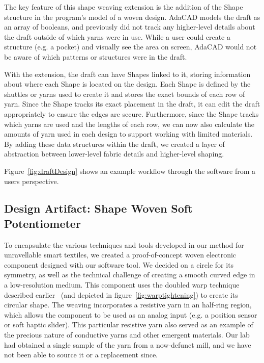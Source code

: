 \documentclass{sigchi}
\newcommand\laura[1]{#1}
\begin{document}
The key feature of this shape weaving extension is the addition of the Shape structure in the program's model of a woven design. AdaCAD models the draft as an array of booleans, and previously did not track any higher-level details about the draft outside of which yarns were in use. While a user could create a structure (e.g. a pocket) and visually see the area on screen, AdaCAD would not be aware of which patterns or structures were in the draft.

With the extension, the draft can have Shapes linked to it, storing information about where each Shape is located on the design. Each Shape is defined by the shuttles or yarns used to create it and stores the exact bounds of each row of yarn. Since the Shape tracks its exact placement in the draft, it can edit the draft appropriately to ensure the edges are secure. Furthermore, since the Shape tracks which yarns are used and the lengths of each row, we can now also calculate the amounts of yarn used in each design to support working with limited materials. By adding these data structures within the draft, we created a layer of abstraction between lower-level fabric details and higher-level shaping.

Figure~\ref{fig:draftDesign} shows an example workflow through the software from a users perspective.

\subsection{Design Artifact: Shape Woven Soft Potentiometer}

To encapsulate the various techniques and tools developed in our method for unravellable smart textiles, we created a proof-of-concept woven electronic component designed with our software tool. We decided on a circle for its symmetry, as well as the technical challenge of creating a smooth curved edge in a low-resolution medium. This component uses the doubled warp technique described earlier ~\laura{(and depicted in figure~\ref{fig:warptightening})} to create its circular shape. The weaving incorporates a resistive yarn in an half-ring region, which allows the component to be used as an analog input (e.g. a position sensor or soft haptic slider). This particular resistive yarn also served as an example of the precious nature of conductive yarns and other emergent materials. Our lab had obtained a single sample of the yarn from a now-defunct mill, and we have not been able to source it or a replacement since.
\end{document}
